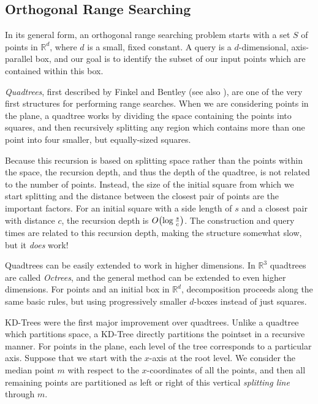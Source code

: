 \subsection*{Orthogonal Range Searching} 

In its general form, an orthogonal range searching problem starts with a set $S$ of points in $\mathbb{R}^d$, where $d$ is a small, fixed constant.
A query is a $d$-dimensional, axis-parallel box, and our goal is to identify the subset of our input points which are contained within this box.

\emph{Quadtrees}, first described by Finkel and Bentley\cite{Finkel74} (see also \cite[Chapter~14]{Deberg}), are one of the very first structures for performing range searches.
When we are considering points in the plane, a quadtree works by dividing the space containing the points into squares, and then recursively splitting any region which contains more than one point into four smaller, but equally-sized squares.

Because this recursion is based on splitting space rather than the points within the space, the recursion depth, and thus the depth of the quadtree, is not related to the number of points. 
Instead, the size of the initial square from which we start splitting and the distance between the closest pair of points are the important factors.
For an initial square with a side length of $s$ and a closest pair with distance $c$, the recursion depth is $O\!\left(\log{\frac{s}{c}}\right)$.
The construction and query times are related to this recursion depth, making the structure somewhat slow, but it \emph{does} work!

Quadtrees can be easily extended to work in higher dimensions. 
In $\mathbb{R}^3$ quadtrees are called \emph{Octrees}, and the general method can be extended to even higher dimensions. 
For points and an initial box in $\mathbb{R}^d$, decomposition proceeds along the same basic rules, but using progressively smaller $d$-boxes instead of just squares.


KD-Trees\cite{Bentley75} were the first major improvement over quadtrees.
Unlike a quadtree which partitions space, a KD-Tree directly partitions the pointset in a recursive manner.
For points in the plane, each level of the tree corresponds to a particular axis.
Suppose that we start with the $x$-axis at the root level.
We consider the median point $m$ with respect to the $x$-coordinates of all the points, and then all remaining points are partitioned as left or right of this vertical \emph{splitting line} through $m$.

